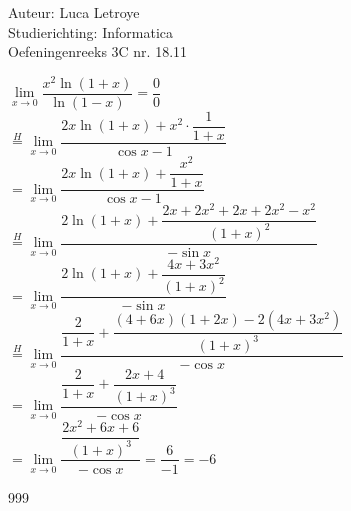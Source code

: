\documentclass[a4paper]{article}
\begin{document}
  
\noindent \large Auteur: Luca Letroye        \\
\noindent \large Studierichting: Informatica \\
\noindent \large Oefeningenreeks 3C nr. 18.11 \\

\medskip

\normalsize

$ \lim\limits_{x \rightarrow 0} \dfrac{x^2\ln(1+x)}{\ln (1-x)} = \dfrac{0}{0}$\\

$ \overset{H}{=}  \lim\limits_{x \rightarrow 0} \dfrac{2x\ln(1+x)+x^2\cdot \dfrac{1}{1+x}}{\cos x - 1}$\\

$ =  \lim\limits_{x \rightarrow 0} \dfrac{2x\ln(1+x)+\dfrac{x^2}{1+x}}{\cos x - 1}$\\

$  \overset{H}{=}  \lim\limits_{x \rightarrow 0} \dfrac{2\ln(1+x)+\dfrac{2x+2x^2+2x+2x^2-x^2}{(1+x)^2}}{-\sin x}$\\

$  = \lim\limits_{x \rightarrow 0} \dfrac{2\ln(1+x)+\dfrac{4x+3x^2}{(1+x)^2}}{-\sin x}$\\

$  \overset{H}{=} \lim\limits_{x \rightarrow 0} \dfrac{\dfrac{2}{1+x}+\dfrac{(4+6x)(1+2x) - 2(4x+3x^2)}{(1+x)^3}}{-\cos x}$\\

$  = \lim\limits_{x \rightarrow 0} \dfrac{\dfrac{2}{1+x}+\dfrac{2x+4}{(1+x)^3}}{-\cos x}$\\

$  = \lim\limits_{x \rightarrow 0} \dfrac{\dfrac{2x^2+6x+6}{(1+x)^3}}{-\cos x} = \dfrac{6}{-1} = -6$\\



\begin{thebibliography}{999}
\end{thebibliography}
\end{document}
